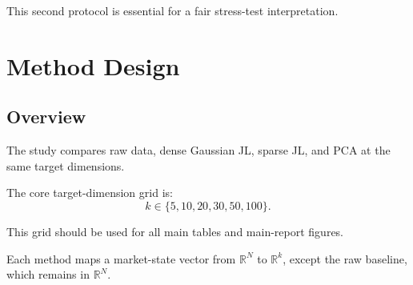 \documentclass[11pt]{article}
\begin{document}
This second protocol is essential for a fair stress-test interpretation.

\section{Method Design}

\subsection{Overview}

The study compares raw data, dense Gaussian JL, sparse JL, and PCA at the same target dimensions.

The core target-dimension grid is:
\[
k \in \{5, 10, 20, 30, 50, 100\}.
\]

This grid should be used for all main tables and main-report figures.

Each method maps a market-state vector from $\mathbb{R}^N$ to $\mathbb{R}^k$, except the raw baseline, which remains in $\mathbb{R}^N$.
\end{document}
